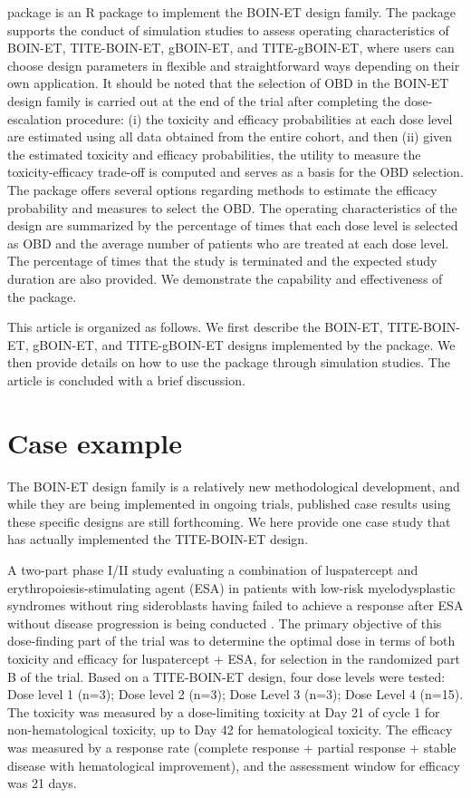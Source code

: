  package \citep{yamaguchi:2025} is an R package to implement the BOIN-ET design family. The package supports the conduct of simulation studies to assess operating characteristics of BOIN-ET, TITE-BOIN-ET, gBOIN-ET, and TITE-gBOIN-ET, where users can choose design parameters in flexible and straightforward ways depending on their own application. It should be noted that the selection of OBD in the BOIN-ET design family is carried out at the end of the trial after completing the dose-escalation procedure: (i) the toxicity and efficacy probabilities at each dose level are estimated using all data obtained from the entire cohort, and then (ii) given the estimated toxicity and efficacy probabilities, the utility to measure the toxicity-efficacy trade-off is computed and serves as a basis for the OBD selection. The  package offers several options regarding methods to estimate the efficacy probability and measures to select the OBD. The operating characteristics of the design are summarized by the percentage of times that each dose level is selected as OBD and the average number of patients who are treated at each dose level. The percentage of times that the study is terminated and the expected study duration are also provided. We demonstrate the capability and effectiveness of the  package.

This article is organized as follows. We first describe the BOIN-ET, TITE-BOIN-ET, gBOIN-ET, and TITE-gBOIN-ET designs implemented by the package. We then provide details on how to use the  package through simulation studies. The article is concluded with a brief discussion.

\section{Case example}
The BOIN-ET design family is a relatively new methodological development, and while they are being implemented in ongoing trials, published case results using these specific designs are still forthcoming. We here provide one case study that has actually implemented the TITE-BOIN-ET design.

A two-part phase I/II study evaluating a combination of luspatercept and erythropoiesis-stimulating agent (ESA) in patients with low-risk myelodysplastic syndromes without ring sideroblasts having failed to achieve a response after ESA without disease progression is being conducted \citep{ades:2024}. The primary objective of this dose-finding part of the trial was to determine the optimal dose in terms of both toxicity and efficacy for luspatercept + ESA, for selection in the randomized part B of the trial. Based on a TITE-BOIN-ET design, four dose levels were tested: Dose level 1 (n=3); Dose level 2 (n=3); Dose Level 3 (n=3); Dose Level 4 (n=15). The toxicity was measured by a dose-limiting toxicity at Day 21 of cycle 1 for non-hematological toxicity, up to Day 42 for hematological toxicity. The efficacy was measured by a response rate (complete response + partial response + stable disease with hematological improvement), and the assessment window for efficacy was 21 days.

